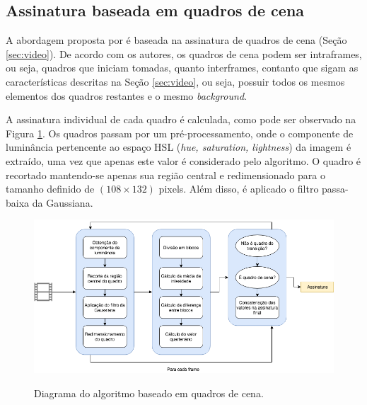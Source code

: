 

 

%
%

\subsection{Assinatura baseada em quadros de cena}

  A abordagem proposta por  é baseada na assinatura de quadros de cena (Seção \ref{sec:video}). De acordo com os autores, os quadros de cena podem ser intraframes, ou seja, quadros que iniciam tomadas, quanto interframes, contanto que sigam as características descritas na Seção \ref{sec:video}, ou seja, possuir todos os mesmos elementos dos quadros restantes e o mesmo \textit{background}.

A assinatura individual de cada quadro é calculada, como pode ser observado na Figura \ref{fig:dia_sceneframe}. Os quadros passam por um pré-processamento, onde o componente de luminância pertencente ao espaço HSL (\textit{hue, saturation, lightness}) da imagem é extraído, uma vez que apenas este valor é considerado pelo algoritmo. O quadro é recortado mantendo-se apenas sua região central e redimensionado para o tamanho definido de $(108\times132)$ pixels. Além disso, é aplicado o filtro passa-baixa da Gaussiana.

\begin{figure}[h]
  \centering
  \caption{Diagrama do algoritmo baseado em quadros de cena.}
  \includegraphics[width=\textwidth]{dados/figuras/diagramas/Diag-SceneFrame}
  \label{fig:dia_sceneframe}
\end{figure}

